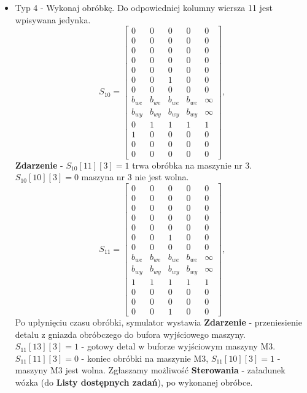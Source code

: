 \documentclass[10pt, a4paper]{article}
\begin{document}
\begin{itemize}
\item Typ 4 - Wykonaj obróbkę.
Do odpowiedniej kolumny wiersza 11 jest wpisywana jedynka.
\begin{equation*}
S_{10}=\left[\begin{array}{ccccc}
0 & 0 & 0 & 0&0\\
0 & 0 & 0 & 0 & 0\\
0 & 0 & 0 & 0& 0\\
0 & 0 & 0 & 0& 0\\
0 & 0 & 0 & 0& 0\\
0 & 0 & 1 & 0 & 0\\
0 & 0 & 0 & 0& 0\\
b_{we}& b_{we}& b_{we}& b_{we} & \infty\\
b_{wy}& b_{wy}& b_{wy}& b_{wy} & \infty\\
0 & 1& 1& 1 & 1\\
1 & 0 & 0 & 0 & 0\\
0 & 0 & 0 & 0 & 0\\
0 & 0 & 0 & 0 & 0
\end{array}\right],
\end{equation*}
\textbf{Zdarzenie} - $S_{10}[11][3]=1$ trwa obróbka na maszynie nr 3. $S_{10}[10][3]=0$ maszyna nr 3 nie jest wolna. 
\begin{equation*}
S_11=\left[\begin{array}{ccccc}
0 & 0 & 0 & 0&0\\
0 & 0 & 0 & 0 & 0\\
0 & 0 & 0 & 0& 0\\
0 & 0 & 0 & 0& 0\\
0 & 0 & 0 & 0& 0\\
0 & 0 & 1 & 0 & 0\\
0 & 0 & 0 & 0& 0\\
b_{we}& b_{we}& b_{we}& b_{we} & \infty\\
b_{wy}& b_{wy}& b_{wy}& b_{wy} & \infty\\
1 & 1& 1& 1 & 1\\
0 & 0 & 0 & 0 & 0\\
0 & 0 & 0 & 0 & 0\\
0 & 0 & 1 & 0 & 0
\end{array}\right],
\end{equation*}
Po upłynięciu czasu obróbki, symulator wystawia \textbf{Zdarzenie} - przeniesienie detalu z gniazda obróbczego do bufora wyjściowego maszyny. $S_{11}[13][3]=1$ - gotowy detal w buforze wyjściowym maszyny M3. $S_{11}[11][3]=0$ - koniec obróbki na maszynie M3, $S_{11}[10][3]=1$ - maszyny M3 jest wolna. Zgłaszamy możliwość \textbf{Sterowania} - załadunek wózka (do \textbf{Listy dostępnych zadań}), po wykonanej obróbce.
\end{itemize}
\end{document}
